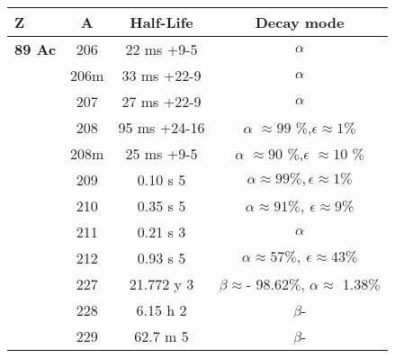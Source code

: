 \pagebreak\begin{table}[ht]
        \centering
        \begin{adjustbox}{width=0.8\textwidth}
        \begin{tabular}{|l|c|c|c|}
            \hline
        \textbf{Z} & \textbf{A} & \textbf{Half-Life} & \textbf{Decay mode}\\[0.5cm]\hline
        \textbf{{89} Ac}  & {206} & {22 ms +9-5} &  {$\alpha$}\\
                       {} & {206m} & {33 ms +22-9} & {$\alpha$}\\
                       
                       {} & {207} & {27 ms +22-9} & {$\alpha$}\\
                       
                       {} & {208} & {95 ms +24-16} & {$\alpha$ $\approx99$ $\%$,$\epsilon$$\approx1$$\%$}\\[0.5em]
                       
                       {} & {208m} & {25 ms +9-5} & {$\alpha$ $\approx90$ $\%$,$\epsilon$ $\approx10$ $\%$}\\[0.5em]
                       
                       {} & {209} & {0.10 s 5} & {$\alpha\approx99\%,\epsilon \approx1\%$}\\[0.5em]
                       
                       {} & {210} & {0.35 s 5} & {$\alpha\approx91\%,~\epsilon \approx9$\%}\\[0.5em]
                       
                       {} & {211} & {0.21 s 3} & {$\alpha$}\\
                       
                       {} & {212} & {0.93 s 5} & {$\alpha\approx57\%,~\epsilon \approx43\%$ }\\[0.5em]
                       
                       {} & {227} & {21.772 y 3} & {$\beta\approx$- 98.62$\%$, $\alpha\approx$ 1.38$\%$}\\[0.5em]
                  
                       {} & {228} & {6.15 h 2} & {$\beta$-}\\
                       
                       {} & {229} & {62.7 m 5} & {$\beta$-}\\
                       

\end{tabular}
\end{adjustbox}
\end{table}

